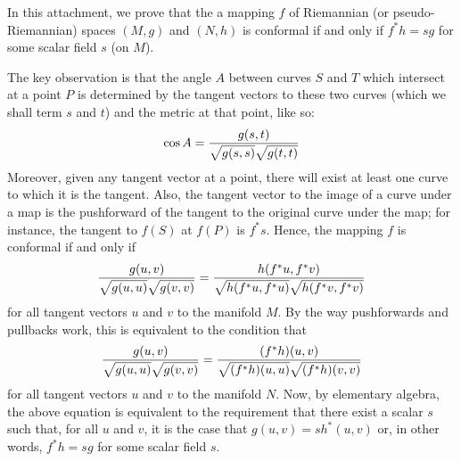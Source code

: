 \documentclass[12pt]{article}
\begin{document}
In this attachment, we prove that the a mapping $f$ of Riemannian (or
pseudo-Riemannian) spaces $(M,g)$ and $(N,h)$ is conformal if and only if 
$f^* h = s g$ for some scalar field $s$ (on $M$).

The key observation is that the angle $A$ between curves $S$ and $T$ which 
intersect at a point $P$ is determined by the tangent vectors to these two curves 
(which we shall term $s$ and $t$) and the metric at that point, like so:
 \[ \cos A = {g(s,t) \over \sqrt{g(s,s)} \sqrt{g(t,t)}}\]
Moreover, given any tangent vector at a point, there will exist at least one
curve to which it is the tangent.  Also, the tangent vector to the image of
a curve under a map is the pushforward of the tangent to the original curve
under the map; for instance, the tangent to $f(S)$ at $f(P)$ is $f^* s$.  Hence, 
the mapping $f$ is conformal if and only if
 \[{g(u,v) \over \sqrt{g(u,u)} \sqrt{g(v,v)}} = {h(f^* u, f^* v) \over 
\sqrt{h(f^* u, f^* u)} \sqrt{h(f^* v, f^* v)}}\]
for all tangent vectors $u$ and $v$ to the manifold $M$.  By the way pushforwards 
and pullbacks work, this is equivalent to the condition that
 \[{g(u,v) \over \sqrt{g(u,u)} \sqrt{g(v,v)}} = {(f^*  h)(u, v) \over 
\sqrt{(f^*  h)(u, u)} \sqrt{(f^* h)(v, v)}}\]
for all tangent vectors $u$ and $v$ to the manifold $N$.  Now, by elementary
algebra, the above equation is equivalent to the requirement that there
exist a scalar $s$ such that, for all $u$ and $v$, it is the case that 
$g(u,v) = s h^* (u,v)$ or, in other words, $f^* h = s g$ for some scalar 
field $s$.
\end{document}
